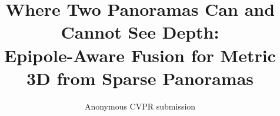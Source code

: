\documentclass[10pt,twocolumn,letterpaper]{article}
\title{Where Two Panoramas Can and Cannot See Depth:\\Epipole-Aware Fusion for Metric 3D from Sparse Panoramas}
\author{Anonymous CVPR submission}
\begin{document}
\maketitle






{
    \small
    
    
}
\end{document}
